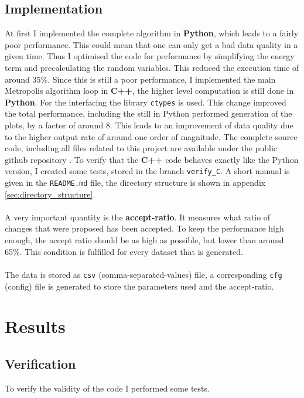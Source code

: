 \documentclass{scrartcl}
\begin{document}
	\subsection{Implementation}
		At first I implemented the complete algorithm in \textbf{Python}, which leads to a fairly poor performance.
		This could mean that one can only get a bad data quality in a given time.
		Thus I optimised the code for performance by simplifying the energy term and precalculating the random variables.
		This reduced the execution time of around 35\%.
		Since this is still a poor performance, I implemented the main Metropolis algorithm loop in \textbf{C++}, the higher level computation is still done in \textbf{Python}.
		For the interfacing the library \verb!ctypes! is used.
		This change improved the total performance, including the still in Python performed generation of the plots, by a factor of around 8.
		This leads to an improvement of data quality due to the higher output rate of around one order of magnitude.
		The complete source code, including all files related to this project are available under the public github repository \cite{github}.
		To verify that the \textbf{C++} code behaves exactly like the Python version, I created some tests, stored in the branch \verb!verify_C!.
		A short manual is given in the \verb!README.md! file, the directory structure is shown in appendix \ref{sec:directory_structure}.
		\\\\
		A very important quantity is the \textbf{accept-ratio}.
		It measures what ratio of changes that were proposed has been accepted.
		To keep the performance high enough, the accept ratio should be as high as possible, but lower than around 65\%.
		This condition is fulfilled for every dataset that is generated.
		\\\\
		The data is stored as \verb!csv! (comma-separated-values) file, a corresponding \verb!cfg! (config) file is generated to store the parameters used and the accept-ratio.

	\section{Results}
	\subsection{Verification}
		To verify the validity of the code I performed some tests.
\end{document}
